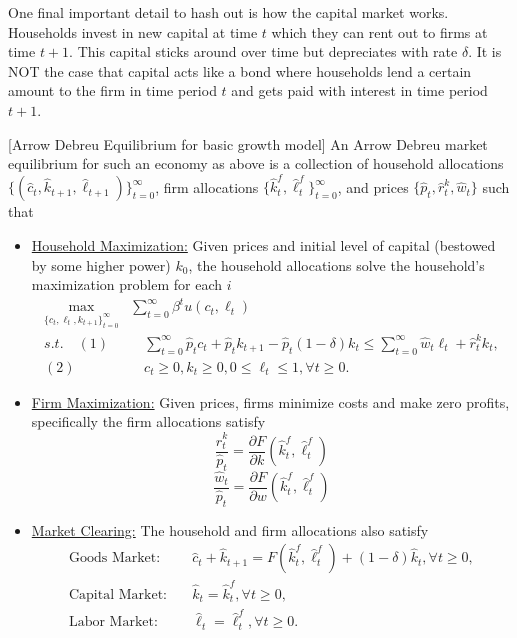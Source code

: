 \documentclass[11pt,english]{article}
\begin{document}
One final important detail to hash out is how the capital market works. Households invest in new capital at time $t$ which they can rent out to firms at time $t+1$. This capital sticks around over time but depreciates with rate $\delta$. It is NOT the case that capital acts like a bond where households lend a certain amount to the firm in time period $t$ and gets paid with interest in time period $t+1$.
\begin{definition}{[Arrow Debreu Equilibrium for basic growth model]} An Arrow Debreu market equilibrium for such an economy as above is a collection of household allocations $\{( \hat{c}_t, \hat{k}_{t+1}, \hat{\ell}_{t+1})\}_{t=0}^\infty$, firm allocations $\{\hat{k}_t^f, \hat{\ell}_t^f\}_{t=0}^\infty$, and prices $\{\hat{p}_t, \hat{r}_t^k, \hat{w}_t\}$ such that 
\begin{itemize}
\item \underline{Household Maximization:} Given prices and initial level of capital (bestowed by some higher power) $k_0$, the household allocations solve the household's maximization problem for each $i$ \begin{align*}
\max_{\{c_t, \ell_t, k_{t+1}\}_{t=0}^\infty} &\sum_{t=0}^\infty \beta^t u(c_t, \ell_t)\\
s.t.\quad  (1)&\quad \sum_{t=0}^\infty \hat{p}_t c_t + \hat{p}_tk_{t+1}  - \hat{p}_t(1 - \delta)k_t\leq \sum_{t=0}^\infty \hat{w}_t \ell_t + \hat{r}^k_t k_t,\\
(2)&\quad c_t \geq 0, k_t \geq 0, 0 \leq \ell_t \leq 1, \forall t\geq 0.
\end{align*}
\item \underline{Firm Maximization:} Given prices, firms minimize costs and make zero profits, specifically the firm allocations satisfy
$$\frac{\hat{r}^k_t}{\hat{p}_t} = \frac{\partial F}{\partial k}(\hat{k}_t^f, \hat{\ell}^f_t)$$
$$\frac{\hat{w}_t}{\hat{p}_t} = \frac{\partial F}{\partial w}(\hat{k}_t^f, \hat{\ell}^f_t)$$

\item \underline{Market Clearing:} The household and firm allocations also satisfy \begin{align*}
\text{Goods Market:}&\quad \hat{c}_t + \hat{k}_{t+1}  = F(\hat{k}_t^f, \hat{\ell}_t^f) + (1 - \delta)\hat{k}_t,\forall t \geq 0,\\
\text{Capital Market:}&\quad \hat{k}_t = \hat{k}_t^f,\forall t \geq 0,\\
\text{Labor Market:}&\quad \hat{\ell}_t = \hat{\ell}_t^f,\forall t \geq 0.
\end{align*}
\end{itemize}
\end{definition}
\end{document}
